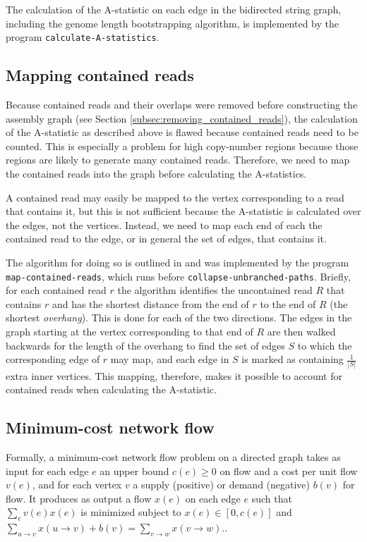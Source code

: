 \documentclass[12pt]{article}
\newcommand{\Subsection}[1]{Section \ref{#1}}
\newcommand{\KeyTerm}[1]{{\it #1}}
\newcommand{\ProgramName}[1]{{\tt #1}}
\begin{document}
The calculation of the A-statistic on each edge in the bidirected string graph,
including the genome length bootstrapping algorithm, is implemented by the
program {\tt calculate-A-statistics}.

\subsection{Mapping contained reads}

Because contained reads and their overlaps were removed before constructing the
assembly graph (see \Subsection{subsec:removing_contained_reads}), the
calculation of the A-statistic as described above is flawed because contained
reads need to be counted.  This is especially a problem for high copy-number
regions because those regions are likely to generate many contained reads.
Therefore, we need to map the contained reads into the graph before calculating
the A-statistics.

A contained read may easily be mapped to the vertex corresponding to a read that
contains it, but this is not sufficient because the A-statistic is calculated
over the edges, not the vertices.  Instead, we need to map each end of each the
contained read to the edge, or in general the set of edges, that contains it.

The algorithm for doing so is outlined in \cite{Myers2005} and was implemented
by the program \ProgramName{map-contained-reads}, which runs before
\ProgramName{collapse-unbranched-paths}.  Briefly, for each contained read $r$
the algorithm identifies the uncontained read $R$ that contains $r$ and has the
shortest distance from the end of $r$ to the end of $R$ (the shortest
\KeyTerm{overhang}).  This is done for each of the two directions.  The edges in
the graph starting at the vertex corresponding to that end of $R$ are then
walked backwards for the length of the overhang to find the set of edges $S$ to
which the corresponding edge of $r$ may map, and each edge in $S$ is marked as
containing $\frac{1}{|S|}$ extra inner vertices.  This mapping, therefore, makes
it possible to account for contained reads when calculating the A-statistic.

\label{subsec:mapping_contained_reads}

\subsection{Minimum-cost network flow}

Formally, a minimum-cost network flow problem on a directed graph takes as input
for each edge $e$ an upper bound $c(e) \ge 0$ on flow and a cost per unit flow
$v(e)$, and for each vertex $v$ a supply (positive) or demand (negative)
$b(v)$ for flow.  It produces as output a flow $x(e)$ on each edge $e$ such
that $\sum_e v(e)x(e)$ is minimized subject to $x(e) \in [0, c(e)]$ and
$\sum_{u \to v}x(u \to v) + b(v) = \sum_{v \to w} x(v \to w)$.\cite{Myers2005}.
\end{document}
